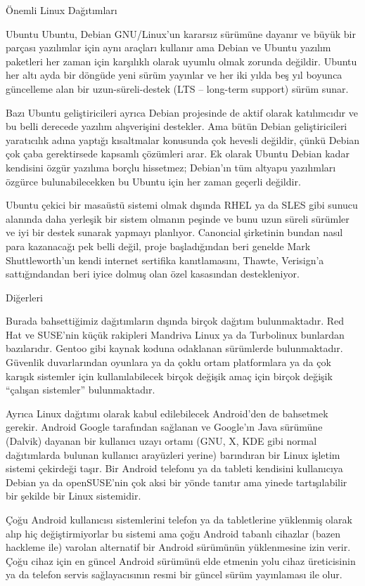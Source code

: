 \begin{section}{Önemli Linux Dağıtımları}
\begin{subsection}{Ubuntu}
Ubuntu, Debian GNU/Linux'un kararsız sürümüne dayanır ve büyük bir parçası yazılımlar için aynı araçları kullanır ama Debian ve Ubuntu yazılım paketleri her zaman için karşılıklı olarak uyumlu olmak zorunda değildir. Ubuntu her altı ayda bir döngüde yeni sürüm yayınlar ve her iki yılda beş yıl boyunca güncelleme alan bir uzun-süreli-destek (LTS – long-term support) sürüm sunar.

Bazı Ubuntu geliştiricileri ayrıca Debian projesinde de aktif olarak katılımcıdır ve bu belli derecede yazılım alışverişini destekler. Ama bütün Debian geliştiricileri yaratıcılık adına yaptığı kısaltmalar konusunda çok hevesli değildir, çünkü Debian çok çaba gerektirsede kapsamlı çözümleri arar. Ek olarak Ubuntu Debian kadar kendisini özgür yazılıma borçlu hissetmez; Debian'ın tüm altyapu yazılımları özgürce bulunabilecekken bu Ubuntu için her zaman geçerli değildir.

Ubuntu çekici bir masaüstü sistemi olmak dışında RHEL ya da SLES gibi sunucu alanında daha yerleşik bir sistem olmanın peşinde ve bunu uzun süreli sürümler ve iyi bir destek sunarak yapmayı planlıyor. Canoncial şirketinin bundan nasıl para kazanacağı pek belli değil, proje başladığından beri genelde Mark Shuttleworth'un kendi internet sertifika kanıtlamasını, Thawte, Verisign'a sattığındandan beri iyice dolmuş olan özel kasasından destekleniyor.

\end{subsection}
\begin{subsection}{Diğerleri}

Burada bahsettiğimiz dağıtımların dışında birçok dağıtım bulunmaktadır. Red Hat ve SUSE'nin küçük rakipleri Mandriva Linux ya da Turbolinux bunlardan bazılarıdır. Gentoo gibi kaynak koduna odaklanan sürümlerde bulunmaktadır. Güvenlik duvarlarından oyunlara ya da çoklu ortam platformlara ya da çok karışık sistemler için kullanılabilecek birçok değişik amaç için birçok değişik “çalışan sistemler” bulunmaktadır.

Ayrıca Linux dağıtımı olarak kabul edilebilecek Android'den de bahsetmek gerekir. Android Google tarafından sağlanan ve Google'ın Java sürümüne (Dalvik) dayanan bir kullanıcı uzayı ortamı (GNU, X, KDE gibi normal dağıtımlarda bulunan kullanıcı arayüzleri yerine) barındıran bir Linux işletim sistemi çekirdeği taşır. Bir Android telefonu ya da tableti kendisini kullanıcıya Debian ya da openSUSE'nin çok aksi bir yönde tanıtır ama yinede tartışılabilir bir şekilde bir Linux sistemidir.

Çoğu Android kullanıcısı sistemlerini telefon ya da tabletlerine yüklenmiş olarak alıp hiç değiştirmiyorlar bu sistemi ama çoğu Android tabanlı cihazlar (bazen hackleme ile) varolan alternatif bir Android sürümünün yüklenmesine izin verir. Çoğu cihaz için en güncel Android sürümünü elde etmenin yolu cihaz üreticisinin ya da telefon servis sağlayacısının resmi bir güncel sürüm yayınlaması ile olur.


\end{subsection}
\end{section}
